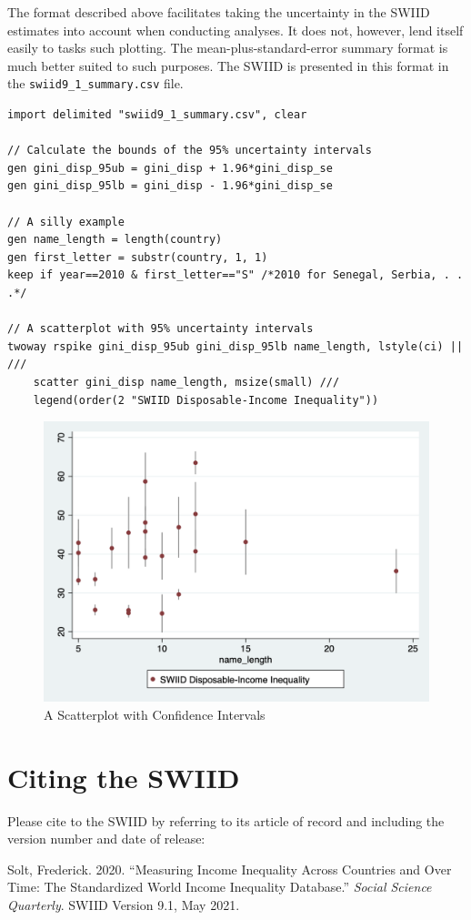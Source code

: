\documentclass[11pt]{article}
\begin{document}
The format described above facilitates taking the uncertainty in the
SWIID estimates into account when conducting analyses. It does not,
however, lend itself easily to tasks such plotting. The
mean-plus-standard-error summary format is much better suited to such
purposes. The SWIID is presented in this format in the
\texttt{swiid9\_1\_summary.csv} file.


\begin{verbatim}
import delimited "swiid9_1_summary.csv", clear
 
// Calculate the bounds of the 95% uncertainty intervals
gen gini_disp_95ub = gini_disp + 1.96*gini_disp_se
gen gini_disp_95lb = gini_disp - 1.96*gini_disp_se

// A silly example
gen name_length = length(country)
gen first_letter = substr(country, 1, 1)
keep if year==2010 & first_letter=="S" /*2010 for Senegal, Serbia, . . .*/

// A scatterplot with 95% uncertainty intervals
twoway rspike gini_disp_95ub gini_disp_95lb name_length, lstyle(ci) || ///
    scatter gini_disp name_length, msize(small) ///
    legend(order(2 "SWIID Disposable-Income Inequality")) 
\end{verbatim}

\begin{figure}[htbp] 
	\caption{A Scatterplot with Confidence Intervals}
	\label{F:scatter}
	\includegraphics[width=6in]{stata_scatter.png}
\end{figure}

\pagebreak
\section{Citing the SWIID}

Please cite to the SWIID by referring to its article of record and including the version number and date of release:\\

\begin{hangparas}{.25in}{1}
Solt, Frederick. 2020. ``Measuring Income Inequality Across Countries and Over Time: The Standardized World Income Inequality Database.'' \emph{Social Science Quarterly}.  SWIID Version 9.1, May 2021.
\end{hangparas}




\pagebreak
\end{document}

